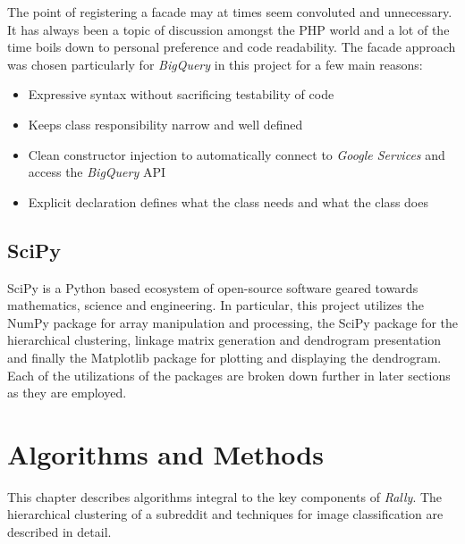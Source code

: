 \documentclass[msc,oneside]{ubcthesis}%
\begin{document}
The point of registering a facade may at times seem convoluted and unnecessary. It has always been a topic of discussion amongst the PHP world and a lot of the time boils down to personal preference and code readability. The facade approach was chosen particularly for \textit{BigQuery} in this project for a few main reasons:
\begin{itemize}
  \item Expressive syntax without sacrificing testability of code
  \item Keeps class responsibility narrow and well defined
  \item Clean constructor injection to automatically connect to \textit{Google Services} and access the \textit{BigQuery} API
  \item Explicit declaration defines what the class needs and what the class does
\end{itemize}

\section{SciPy}
SciPy is a Python based ecosystem of open-source software geared towards mathematics, science and engineering. In particular, this project utilizes the NumPy package for array manipulation and processing, the SciPy package for the hierarchical clustering, linkage matrix generation and dendrogram presentation and finally the Matplotlib package for plotting and displaying the dendrogram. Each of the utilizations of the packages are broken down further in later sections as they are employed.

\chapter{Algorithms and Methods}
This chapter describes algorithms integral to the key components of \textit{Rally}. The hierarchical clustering of a subreddit and techniques for image classification are described in detail.
\end{document}
